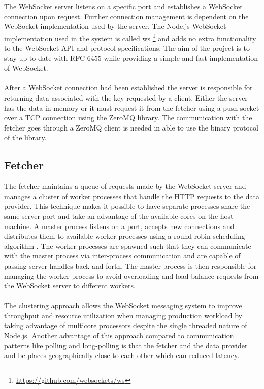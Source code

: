 The WebSocket server listens on a specific port and establishes a WebSocket connection upon request. Further connection management is dependent on the WebSocket implementation used by the server. The Node.js WebSocket implementation used in the system is called ws \footnote{\url{https://github.com/websockets/ws}} and adds no extra functionality to the WebSocket API and protocol specifications. The aim of the project is to stay up to date with RFC 6455 while providing a simple and fast implementation of WebSocket.
\\ \\
After a WebSocket connection had been established the server is responsible for returning data associated with the key requested by a client. Either the server has the data in memory or it must request it from the fetcher using a push socket over a TCP connection using the ZeroMQ library. The communication with the fetcher goes through a ZeroMQ client is needed in able to use the binary protocol of the library.

\subsection{Fetcher}

The fetcher maintains a queue of requests made by the WebSocket server and manages a cluster of worker processes that handle the HTTP requests to the data provider. This technique makes it possible to have separate processes share the same server port and take an advantage of the available cores on the host machine. A master process listens on a port, accepts new connections and distributes them to available worker processes using a round-robin scheduling algorithm \cite{nodeCluster}. The worker processes are spawned such that they can communicate with the master process via inter-process communication and are capable of passing server handles back and forth. The master process is then responsible for managing the worker process to avoid overloading and load-balance requests from the WebSocket server to different workers.
\\ \\
The clustering approach allows the WebSocket messaging system to improve throughput and resource utilization when managing production workload by taking advantage of multicore processors despite the single threaded nature of Node.js. Another advantage of this approach compared to communication patterns like polling and long-polling is that the fetcher and the data provider and be places geographically close to each other which can reduced latency.

